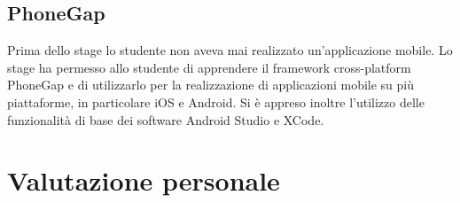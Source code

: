 \subsection{PhoneGap}

Prima dello stage lo studente non aveva mai realizzato un'applicazione mobile. Lo stage ha permesso allo studente di apprendere il framework cross-platform PhoneGap e di utilizzarlo per la realizzazione di applicazioni mobile su più piattaforme, in particolare iOS e Android. Si è appreso inoltre l'utilizzo delle funzionalità di base dei software Android Studio e XCode.

\section{Valutazione personale}
